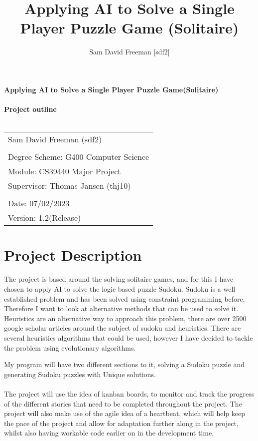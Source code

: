 \documentclass[a4paper,10pt]{article}
\title{Applying AI to Solve a Single Player Puzzle Game (Solitaire)}
\author{Sam David Freeman [sdf2]}
\begin{document}
	\begin{titlepage}
		
		\noindent\LARGE\textbf{Applying AI to Solve a Single Player Puzzle Game(Solitaire)}\\ \\ 
		\Large \textbf{Project outline}\\ \\ 
		\normalsize
		\begin{center}
			\begin{table}[H]
				\begin{tabular}{l}
					Sam David Freeman (sdf2) \\
					\\
					Degree Scheme: G400 Computer Science    \\
					Module: CS39440 Major Project    \\
					Supervisor: Thomas Jansen (thj10)    \\
					                          \\
					Date: 07/02/2023               \\
					Version: 1.2(Release)              
				\end{tabular}
			\end{table}
		\end{center}

	\end{titlepage}

\newpage
\section*{Project Description}
The project is based around the solving solitaire games, and for this I have chosen to apply AI to solve the logic based puzzle Sudoku. Sudoku is a well established problem and has been solved using constraint programming before. Therefore I want to look at alternative methods that can be used to solve it. Heuristics are an alternative way to approach this problem, there are over 2500 google scholar articles around the subject of sudoku and heuristics. There are several heuristics algorithms that could be used, however I have decided to tackle the problem using evolutionary algorithms. 

My program will have two different sections to it, solving a Sudoku puzzle and generating Sudoku puzzles with Unique solutions. \\ \\
The project will use the idea of kanban boards, to monitor and track the progress of the different stories that need to be completed throughout the project. The project will also make use of the agile idea of a heartbeat, which will help keep the pace of the project and allow for adaptation further along in the project, whilst also having workable code earlier on in the development time. 
\end{document}
